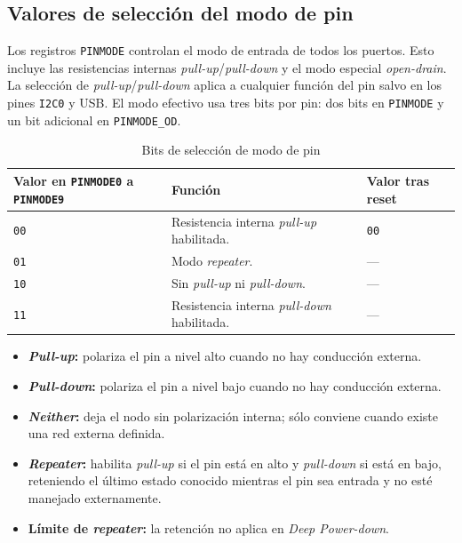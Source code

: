 \subsection{Valores de selección del modo de pin}
Los registros \texttt{PINMODE} controlan el modo de entrada de todos los puertos. Esto incluye las resistencias internas \textit{pull-up}/\textit{pull-down} y el modo especial \textit{open-drain}. La selección de \textit{pull-up}/\textit{pull-down} aplica a cualquier función del pin salvo en los pines \texttt{I2C0} y USB. El modo efectivo usa tres bits por pin: dos bits en \texttt{PINMODE} y un bit adicional en \texttt{PINMODE\_OD}.

\begin{table}[H]
  \centering
  \small
  \renewcommand{\arraystretch}{1.15}
  \caption{Bits de selección de modo de pin}
  \begin{tabularx}{0.9\textwidth}{|>{\raggedright\arraybackslash}p{}|>{\raggedright\arraybackslash}X|>{\raggedright\arraybackslash}p{}|}
    \hline
    \textbf{Valor en \texttt{PINMODE0} a \texttt{PINMODE9}} & \textbf{Función} & \textbf{Valor tras reset} \\
    \hline
    \texttt{00} & Resistencia interna \textit{pull-up} habilitada. & \texttt{00} \\
    \hline
    \texttt{01} & Modo \textit{repeater}. & --- \\
    \hline
    \texttt{10} & Sin \textit{pull-up} ni \textit{pull-down}. & --- \\
    \hline
    \texttt{11} & Resistencia interna \textit{pull-down} habilitada. & --- \\
    \hline
  \end{tabularx}
\end{table}

\begin{itemize}
  \item \textbf{\textit{Pull-up}:} polariza el pin a nivel alto cuando no hay conducción externa.
  \item \textbf{\textit{Pull-down}:} polariza el pin a nivel bajo cuando no hay conducción externa.
  \item \textbf{\textit{Neither}:} deja el nodo sin polarización interna; sólo conviene cuando existe una red externa definida.
  \item \textbf{\textit{Repeater}:} habilita \textit{pull-up} si el pin está en alto y \textit{pull-down} si está en bajo, reteniendo el último estado conocido mientras el pin sea entrada y no esté manejado externamente.
  \item \textbf{Límite de \textit{repeater}:} la retención no aplica en \textit{Deep Power-down}.
\end{itemize}

